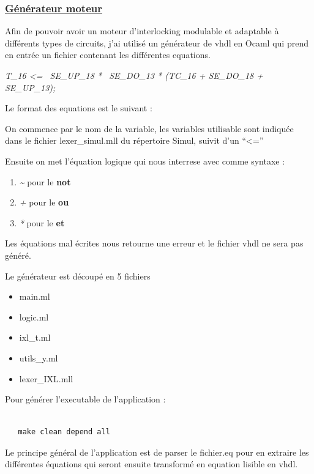 \subsubsection{\underline{Générateur moteur}}
\label{sec:Générateur}


Afin de pouvoir avoir un moteur d'interlocking modulable et adaptable
à différents types de circuits, j'ai utilisé un générateur de vhdl en
Ocaml qui prend en entrée un fichier contenant les différentes
equations.

\emph{T\_16 <= ~SE\_UP\_18 * ~SE\_DO\_13 * (TC\_16 + SE\_DO\_18 + SE\_UP\_13);}


Le format des equations est le suivant :


On commence par le nom de la variable, les variables utilisable sont
indiquée dans le fichier lexer\_simul.mll du répertoire Simul, suivit
d'un ``<='' 

Ensuite on met l'équation logique qui nous interrese avec comme
syntaxe :
\begin{enumerate}[->]
    \item \emph{\~} pour le \textbf{not}
    \item \emph{+} pour le \textbf{ou}
    \item \emph{*} pour le \textbf{et}
    \end{enumerate}

\medskip

Les équations mal écrites nous retourne une erreur et le fichier vhdl
ne sera pas généré.

\newpage

Le générateur est découpé en 5 fichiers
\begin{itemize}
   \item main.ml
   \item logic.ml
   \item ixl\_t.ml
   \item utils\_y.ml
   \item lexer\_IXL.mll     
\end{itemize}  

\medskip

Pour générer l'executable de l'application :

\begin{lstlisting}

   make clean depend all

\end{lstlisting}
  
\medskip

Le principe général de l'application est de parser le fichier.eq pour
en extraire les différentes équations qui seront ensuite transformé en
equation lisible en vhdl.


